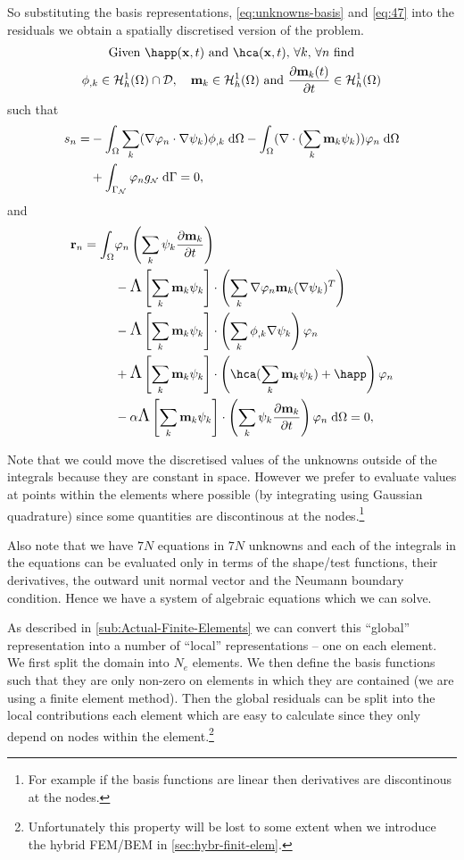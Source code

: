 So substituting the basis representations, \eqref{eq:unknowns-basis} and \eqref{eq:47} into the residuals we obtain a spatially discretised version of the problem.
\begin{gather}
  \label{res:tintro}
  \text{Given $\happ(\xv,t)$ and $\hca(\xv,t)$, $\forall k$, $\forall \ndi$ find} \notag \\
  \phim_{,k} \in \ts \cap \Dfs, \quad
  \mv_{k} \in \ts \text{ and }
  \pd{\mv_k(t)}{t} \in \ts \notag
\end{gather}
such that
\begin{align}
  s_n =
  & - \int_{\Omega} \sum_k (\nabla {\varphi_n} \cdot \nabla {\psi_k}) \phi_{,k} {\; \text{d}} \Omega \notag
  - \int_{\Omega} (\nabla \cdot (\sum_k \mathbf{m}_k {\psi_k}) ) {\varphi_n} {\; \text{d}} \Omega \\
  & + \int_{{\Gamma}_{{\scriptscriptstyle{\mathcal{N}}}}} {\varphi_n} g_{\scriptscriptstyle{\mathcal{N}}} {\; \text{d}} {\Gamma} = 0,
  \label{res:tphi}
\end{align}
and
\begin{align*}
  \rllg_\ndi =
  \int_{\magd} &\tn \left(\sum_k \sk \pd{\mv_k}{t} \right)
  \\
  &- \crossop{\sum_k \mv_k \sk}{\sum_k \nabla \tn \mv_k (\nabla \sk)^T}
  \\
  &- \crossop{\sum_k \mv_k \sk}{\sum_k \phim_{,k} \nabla \sk} \tn
  \\
  &+ \crossop{\sum_k \mv_k \sk}{\hca(\sum_k \mv_k \sk) + \happ} \tn
  \\
  &- \dampc \crossop{\sum_k \mv_k \sk} {\sum_k \sk \pd{\mv_k}{t}} \tn \d \magd = 0,
\end{align*}


Note that we could move the discretised values of the unknowns outside of the integrals because they are constant in space. However we prefer to evaluate values at points within the elements where possible (by integrating using Gaussian quadrature) since some quantities are discontinous at the nodes.\footnote{For example if the basis functions are linear then derivatives are discontinous at the nodes.}

Also note that we have $7N$ equations in $7N$ unknowns and each of the integrals in the equations can be evaluated only in terms of the shape/test functions, their derivatives, the outward unit normal vector and the Neumann boundary condition. Hence we have a system of algebraic equations which we can solve.

As described in \autoref{sub:Actual-Finite-Elements} we can convert this ``global'' representation into a number of ``local'' representations -- one on each element. We first split the domain into $N_e$ elements. We then define the basis functions such that they are only non-zero on elements in which they are contained (\ie we are using a finite element method). Then the global residuals can be split into the local contributions each element which are easy to calculate since they only depend on nodes within the element.\footnote{Unfortunately this property will be lost to some extent when we introduce the hybrid FEM/BEM in \autoref{sec:hybr-finit-elem}.}


